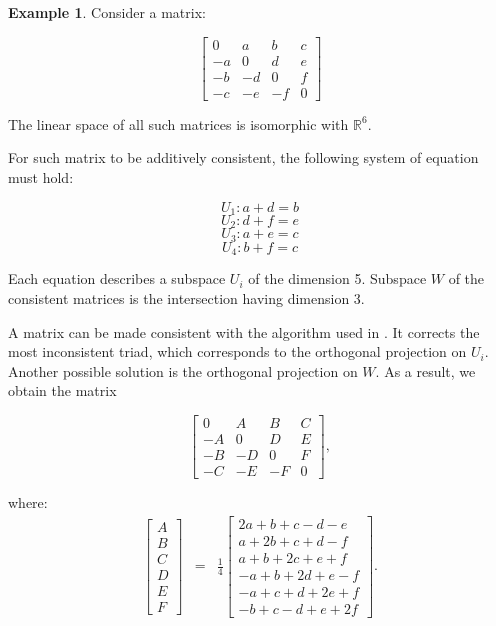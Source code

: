 \documentclass [12pt]{article}
\theoremstyle{definition}
\newtheorem{ex}{\bf Example}
\begin{document}
\begin{ex}

Consider a matrix:

$$
\begin{bmatrix}
 0 & a & b & c \\ 
-a & 0 & d & e \\ 
-b & -d & 0 & f \\ 
-c & -e & -f & 0
\end{bmatrix} 
$$

The linear space of all such matrices is isomorphic with $\mathbb{R}^6$.

For such matrix to be additively consistent,
the following system of equation must hold:

$$U_1: a+d=b$$
$$U_2: d+f=e$$
$$U_3: a+e=c$$
$$U_4: b+f=c$$

Each equation describes a subspace $U_i$ of the dimension 5. Subspace $W$ of the consistent matrices is the intersection having dimension 3.

A matrix can be made consistent with the algorithm used in \cite{HK1996}. It corrects the most inconsistent triad, which corresponds to the orthogonal projection on $U_i$.
Another possible solution is the orthogonal projection on $W$. As a result, we obtain the matrix

$$ \begin{bmatrix}
 0 &  A &  B & C \\ 
-A &  0 &  D & E \\ 
-B & -D &  0 & F \\ 
-C & -E & -F & 0
\end{bmatrix}  ,
$$

where:
\begin{eqnarray*}
\begin{bmatrix}
A\\B\\C\\D\\E\\F
\end{bmatrix}
&=& \frac{1}{4}
\begin{bmatrix}
2a+b+c-d-e \\a+2b+c+d-f\\ a+b+2c+e+f\\ -a+b+2d+e-f\\ -a+c+d+2e+f\\ -b+c-d+e+2f
\end{bmatrix}.
\end{eqnarray*}
\end{ex}
\end{document}
